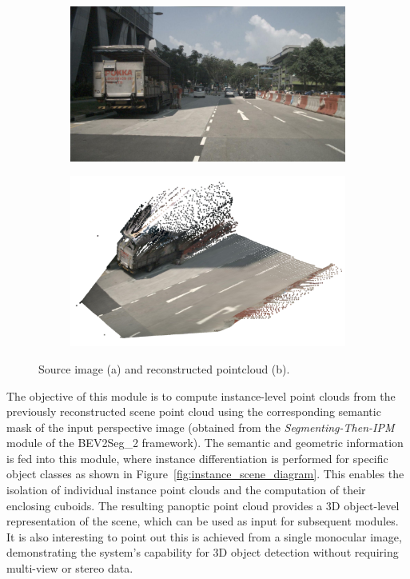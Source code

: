 \begin{figure}[h!]
    \centering
    \begin{subfigure}[b]{0.45\textwidth}
        \includegraphics[width=\textwidth]{images/methodology/raw_image_0.jpg}
        \caption{}
        \label{fig:raw_pointcloud_a}
    \end{subfigure}
    \hfill
    \begin{subfigure}[b]{0.45\textwidth}
        \includegraphics[width=\textwidth]{images/methodology/pcd_raw.png}
        \caption{}
        \label{fig:raw_pointcloud_b}
    \end{subfigure}

    \caption{Source image (a) and reconstructed pointcloud (b).}
    \label{fig:raw_pointcloud}
\end{figure}

The objective of this module is to compute instance-level point clouds from the previously reconstructed scene point cloud using the corresponding semantic mask of the input perspective image (obtained from the \textit{Segmenting-Then-IPM} module of the BEV2Seg\_2 framework). The semantic and geometric information is fed into this module, where instance differentiation is performed for specific object classes as shown in Figure~\ref{fig:instance_scene_diagram}. This enables the isolation of individual instance point clouds and the computation of their enclosing cuboids. The resulting panoptic point cloud provides a 3D object-level representation of the scene, which can be used as input for subsequent modules. It is also interesting to point out this is achieved from a single monocular image, demonstrating the system's capability for 3D object detection without requiring multi-view or stereo data.

